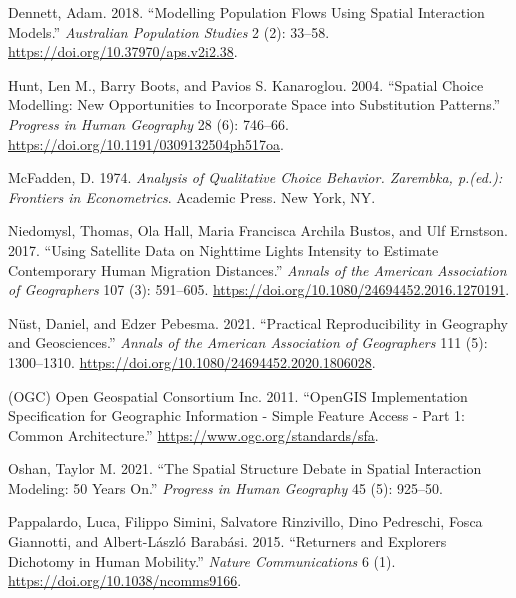 \documentclass[11pt,letterpaper]{article}
\newlength{\cslhangindent}
\newlength{\cslentryspacingunit} %
\newenvironment{CSLReferences}[2] %
 {%
  \setlength{\parindent}{0pt}
  \ifodd #1
  \let\oldpar\par
  \def\par{\hangindent=\cslhangindent\oldpar}
  \fi
  \setlength{\parskip}{#2\cslentryspacingunit}
 }%
 {}
\begin{document}
\hypertarget{refs}{}
\begin{CSLReferences}{1}{0}
\leavevmode{}%
Dennett, Adam. 2018. {``Modelling Population Flows Using Spatial Interaction Models.''} \emph{Australian Population Studies} 2 (2): 33--58. \url{https://doi.org/10.37970/aps.v2i2.38}.

\leavevmode{}%
Hunt, Len M., Barry Boots, and Pavios S. Kanaroglou. 2004. {``Spatial Choice Modelling: New Opportunities to Incorporate Space into Substitution Patterns.''} \emph{Progress in Human Geography} 28 (6): 746--66. \url{https://doi.org/10.1191/0309132504ph517oa}.

\leavevmode{}%
McFadden, D. 1974. \emph{Analysis of Qualitative Choice Behavior. Zarembka, p.(ed.): Frontiers in Econometrics}. Academic Press. New York, NY.

\leavevmode{}%
Niedomysl, Thomas, Ola Hall, Maria Francisca Archila Bustos, and Ulf Ernstson. 2017. {``Using Satellite Data on Nighttime Lights Intensity to Estimate Contemporary Human Migration Distances.''} \emph{Annals of the American Association of Geographers} 107 (3): 591--605. \url{https://doi.org/10.1080/24694452.2016.1270191}.

\leavevmode{}%
Nüst, Daniel, and Edzer Pebesma. 2021. {``Practical Reproducibility in Geography and Geosciences.''} \emph{Annals of the American Association of Geographers} 111 (5): 1300--1310. \url{https://doi.org/10.1080/24694452.2020.1806028}.

\leavevmode{}%
(OGC) Open Geospatial Consortium Inc. 2011. {``OpenGIS Implementation Specification for Geographic Information - Simple Feature Access - Part 1: Common Architecture.''} \url{https://www.ogc.org/standards/sfa}.

\leavevmode{}%
Oshan, Taylor M. 2021. {``The Spatial Structure Debate in Spatial Interaction Modeling: 50 Years On.''} \emph{Progress in Human Geography} 45 (5): 925--50.

\leavevmode{}%
Pappalardo, Luca, Filippo Simini, Salvatore Rinzivillo, Dino Pedreschi, Fosca Giannotti, and Albert-László Barabási. 2015. {``Returners and Explorers Dichotomy in Human Mobility.''} \emph{Nature Communications} 6 (1). \url{https://doi.org/10.1038/ncomms9166}.


\end{CSLReferences}
\end{document}
